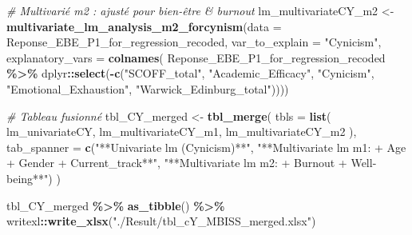 \documentclass[
]{article}
\newenvironment{Shaded}{\begin{snugshade}}{\end{snugshade}}
\newcommand{\AttributeTok}[1]{\textcolor[rgb]{0.13,0.29,0.53}{#1}}
\newcommand{\CommentTok}[1]{\textcolor[rgb]{0.56,0.35,0.01}{\textit{#1}}}
\newcommand{\FunctionTok}[1]{\textcolor[rgb]{0.13,0.29,0.53}{\textbf{#1}}}
\newcommand{\NormalTok}[1]{#1}
\newcommand{\OtherTok}[1]{\textcolor[rgb]{0.56,0.35,0.01}{#1}}
\newcommand{\SpecialCharTok}[1]{\textcolor[rgb]{0.81,0.36,0.00}{\textbf{#1}}}
\newcommand{\StringTok}[1]{\textcolor[rgb]{0.31,0.60,0.02}{#1}}
\begin{document}
\begin{Shaded}
\begin{Highlighting}[]
\CommentTok{\# Multivarié m2 : ajusté pour bien{-}être \& burnout}
\NormalTok{lm\_multivariateCY\_m2 }\OtherTok{\textless{}{-}}
  \FunctionTok{multivariate\_lm\_analysis\_m2\_forcynism}\NormalTok{(}\AttributeTok{data =}\NormalTok{ Reponse\_EBE\_P1\_for\_regression\_recoded, }
                                                        \AttributeTok{var\_to\_explain =} \StringTok{"Cynicism"}\NormalTok{, }
                                                        \AttributeTok{explanatory\_vars =}
                                                          \FunctionTok{colnames}\NormalTok{(}
\NormalTok{                                                            Reponse\_EBE\_P1\_for\_regression\_recoded }\SpecialCharTok{\%\textgreater{}\%}
\NormalTok{                                                              dplyr}\SpecialCharTok{::}\FunctionTok{select}\NormalTok{(}\SpecialCharTok{{-}}\FunctionTok{c}\NormalTok{(}\StringTok{"SCOFF\_total"}\NormalTok{, }\StringTok{"Academic\_Efficacy"}\NormalTok{,  }\StringTok{"Cynicism"}\NormalTok{,  }\StringTok{"Emotional\_Exhaustion"}\NormalTok{, }\StringTok{"Warwick\_Edinburg\_total"}\NormalTok{))))}

\CommentTok{\# Tableau fusionné}
\NormalTok{tbl\_CY\_merged }\OtherTok{\textless{}{-}}
  \FunctionTok{tbl\_merge}\NormalTok{(}
    \AttributeTok{tbls =} \FunctionTok{list}\NormalTok{(}
\NormalTok{      lm\_univariateCY,}
\NormalTok{      lm\_multivariateCY\_m1,}
\NormalTok{      lm\_multivariateCY\_m2}
\NormalTok{    ),}
    \AttributeTok{tab\_spanner =} \FunctionTok{c}\NormalTok{(}\StringTok{"**Univariate lm (Cynicism)**"}\NormalTok{,}
                    \StringTok{"**Multivariate lm m1: + Age + Gender + Current\_track**"}\NormalTok{,}
                    \StringTok{"**Multivariate lm m2: + Burnout + Well{-}being**"}\NormalTok{)}
\NormalTok{  )}

\NormalTok{tbl\_CY\_merged }\SpecialCharTok{\%\textgreater{}\%}  \FunctionTok{as\_tibble}\NormalTok{() }\SpecialCharTok{\%\textgreater{}\%}
\NormalTok{  writexl}\SpecialCharTok{::}\FunctionTok{write\_xlsx}\NormalTok{(}\StringTok{"./Result/tbl\_cY\_MBISS\_merged.xlsx"}\NormalTok{)}
\end{Highlighting}
\end{Shaded}
\end{document}
